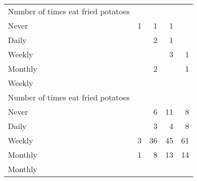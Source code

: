 \documentclass{article}
\begin{document}
\begin{tabular}{lllll}
\multicolumn{1}{l}{\hspace{4em}Number of times eat fried potatoes} &
  \multicolumn{1}{|r}{} &
  \multicolumn{1}{r}{} &
  \multicolumn{1}{r}{} &
  \multicolumn{1}{r}{} \\
\multicolumn{1}{l}{\hspace{5em}Never} &
  \multicolumn{1}{|r}{1} &
  \multicolumn{1}{r}{1} &
  \multicolumn{1}{r}{1} &
  \multicolumn{1}{r}{} \\
\multicolumn{1}{l}{\hspace{5em}Daily} &
  \multicolumn{1}{|r}{} &
  \multicolumn{1}{r}{2} &
  \multicolumn{1}{r}{1} &
  \multicolumn{1}{r}{} \\
\multicolumn{1}{l}{\hspace{5em}Weekly} &
  \multicolumn{1}{|r}{} &
  \multicolumn{1}{r}{} &
  \multicolumn{1}{r}{3} &
  \multicolumn{1}{r}{1} \\
\multicolumn{1}{l}{\hspace{5em}Monthly} &
  \multicolumn{1}{|r}{} &
  \multicolumn{1}{r}{2} &
  \multicolumn{1}{r}{} &
  \multicolumn{1}{r}{1} \\
\multicolumn{1}{l}{\hspace{3em}Weekly} &
  \multicolumn{1}{|r}{} &
  \multicolumn{1}{r}{} &
  \multicolumn{1}{r}{} &
  \multicolumn{1}{r}{} \\
\multicolumn{1}{l}{\hspace{4em}Number of times eat fried potatoes} &
  \multicolumn{1}{|r}{} &
  \multicolumn{1}{r}{} &
  \multicolumn{1}{r}{} &
  \multicolumn{1}{r}{} \\
\multicolumn{1}{l}{\hspace{5em}Never} &
  \multicolumn{1}{|r}{} &
  \multicolumn{1}{r}{6} &
  \multicolumn{1}{r}{11} &
  \multicolumn{1}{r}{8} \\
\multicolumn{1}{l}{\hspace{5em}Daily} &
  \multicolumn{1}{|r}{} &
  \multicolumn{1}{r}{3} &
  \multicolumn{1}{r}{4} &
  \multicolumn{1}{r}{8} \\
\multicolumn{1}{l}{\hspace{5em}Weekly} &
  \multicolumn{1}{|r}{3} &
  \multicolumn{1}{r}{36} &
  \multicolumn{1}{r}{45} &
  \multicolumn{1}{r}{61} \\
\multicolumn{1}{l}{\hspace{5em}Monthly} &
  \multicolumn{1}{|r}{1} &
  \multicolumn{1}{r}{8} &
  \multicolumn{1}{r}{13} &
  \multicolumn{1}{r}{14} \\
\multicolumn{1}{l}{\hspace{3em}Monthly} &

\end{tabular}
\end{document}
